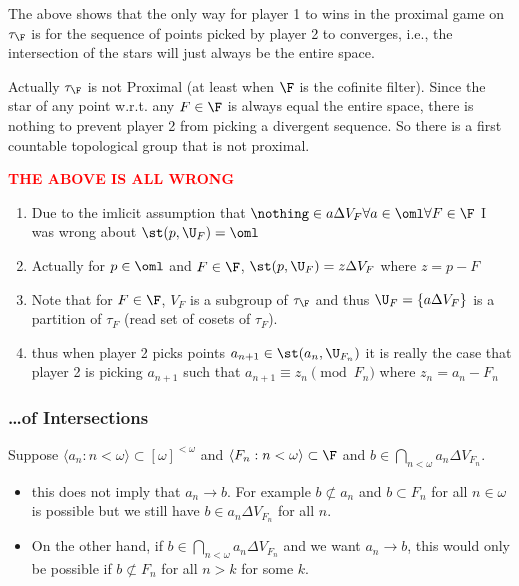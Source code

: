 \documentclass{article}
\begin{document}
\begin{rem}
    The above shows that the only way for player 1 to wins in the proximal game on \(\tau_{\F}\) is for the sequence of points picked by player 2 to converges, i.e., the intersection of the stars will just always be the entire space. 
\end{rem}
\begin{rem}
    Actually \(\tau_{\F}\) is not Proximal (at least when \(\F\) is the cofinite filter). Since the star of any point w.r.t. any \(F \in \F\) is always equal the entire space, there is nothing to prevent player 2 from picking a divergent sequence. So there is a first countable topological group that is not proximal.
\end{rem}
\textcolor{red}{\textbf{THE ABOVE IS ALL WRONG}}
\begin{enumerate}
    \item Due to the imlicit assumption that \(\nothing \in a\Delta V_F \forall a\in\oml\forall F \in \F\) I was wrong about \(\st(p, \U_F) = \oml\)
    \item Actually for \(p \in \oml\) and \(F \in \F\), \(\st(p, \U_F) = z\Delta V_F\) where \(z = p - F\)
    \item Note that for \(F \in \F\), \(V_F\) is a subgroup of \(\tau_{\F}\) and thus \(\U_F = \{a\Delta V_F\}\) is a partition of \(\tau_F\) (read set of cosets of \(\tau_F\)).
    \item thus when player 2 picks points \(a_{n + 1} \in \st(a_n, \U_{F_n})\) it is really the case that player 2 is picking \(a_{n + 1}\) such that \(a_{n + 1} \equiv z_n \pmod {F_n}\) where \(z_n = a_n - F_n\)
\end{enumerate}
\subsubsection*{\dots of Intersections}

Suppose \(\langle a_n:n < \omega\rangle \subset  [\omega]^{<\omega}\) and \(\langle F_n : n < \omega\rangle \subset \F\) and \(b \in \bigcap_{n < \omega} a_n \Delta V_{F_n}\). 

\begin{itemize}
    \item this does not imply that \(a_n \to b\). For example \(b \not \subset a_n\) and \(b \subset F_n\) for all \(n \in \omega\) is possible but we still have \(b \in a_n \Delta V_{F_n}\) for all \(n\).
    \item On the other hand, if \(b \in \bigcap_{n < \omega} a_n \Delta V_{F_n}\) and we want \(a_n \to b\), this would only be possible if \(b \not \subset F_n\) for all \(n > k\) for some \(k\).
\end{itemize}
\end{document}
